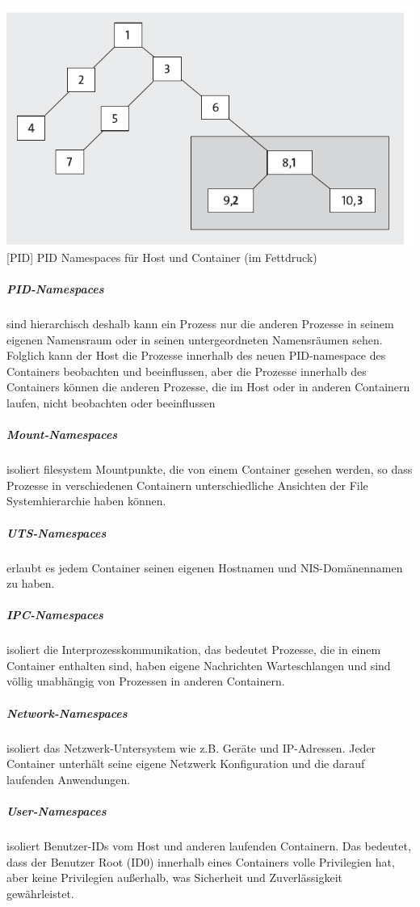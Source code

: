 \vspace{1em}
\begin{minipage}{\linewidth}
	\centering
	\includegraphics[width=1\linewidth]{pics/PID.PNG}
	[PID]{ PID Namespaces für Host und Container (im Fettdruck) \cite{Liebel2017SkalierbareContainer-Infrastrukturen}}
	\label{fig:PID}
\end{minipage}

\subparagraph{PID-Namespaces} sind hierarchisch deshalb kann ein Prozess nur die anderen Prozesse in seinem eigenen Namensraum oder in seinen untergeordneten Namensräumen sehen. Folglich kann der Host die Prozesse innerhalb des neuen PID-namespace des Containers beobachten und beeinflussen, aber die Prozesse innerhalb des Containers können die anderen Prozesse, die im Host oder in anderen Containern laufen, nicht beobachten oder beeinflussen

\subparagraph{Mount-Namespaces} isoliert filesystem Mountpunkte, die von einem Container gesehen werden, so dass Prozesse in verschiedenen Containern unterschiedliche Ansichten der File Systemhierarchie haben können.

\subparagraph{UTS-Namespaces} erlaubt es jedem Container seinen eigenen Hostnamen und NIS-Domänennamen zu haben.

\subparagraph{IPC-Namespaces} isoliert die Interprozesskommunikation, das bedeutet Prozesse, die in einem Container enthalten sind, haben eigene Nachrichten Warteschlangen und sind völlig unabhängig von Prozessen in anderen Containern.

\subparagraph{Network-Namespaces} isoliert das Netzwerk-Untersystem wie z.B. Geräte und IP-Adressen. Jeder Container unterhält seine eigene Netzwerk Konfiguration und die darauf laufenden Anwendungen.

\subparagraph{User-Namespaces} isoliert Benutzer-IDs vom Host und anderen laufenden Containern. Das bedeutet, dass der Benutzer Root (ID0) innerhalb eines Containers volle Privilegien hat, aber keine Privilegien außerhalb, was Sicherheit und Zuverlässigkeit gewährleistet. \cite{Xavier2015AClouds}

